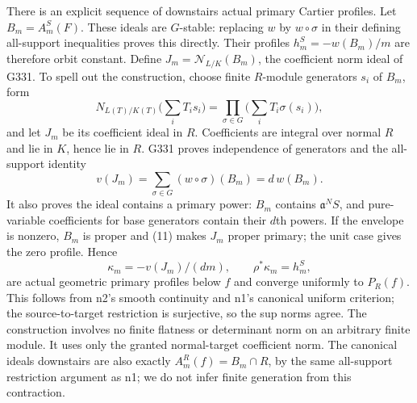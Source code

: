 There is an explicit sequence of downstairs actual primary Cartier profiles. Let $B_m=A_m^S(F)$. These ideals are $G$-stable: replacing $w$ by $w\circ\sigma$ in their defining all-support inequalities proves this directly. Their profiles $h_m^S=-w(B_m)/m$ are therefore orbit constant. Define $J_m=\mathcal N_{L/K}(B_m)$, the coefficient norm ideal of G331. To spell out the construction, choose finite $R$-module generators $s_i$ of $B_m$, form
\[
 N_{L(T)/K(T)}\Big(\sum_i T_i s_i\Big)
 =\prod_{\sigma\in G}\Big(\sum_i T_i\sigma(s_i)\Big),
\]
and let $J_m$ be its coefficient ideal in $R$. Coefficients are integral over normal $R$ and lie in $K$, hence lie in $R$. G331 proves independence of generators and the all-support identity
\[
 v(J_m)=\sum_{\sigma\in G}(w\circ\sigma)(B_m)=d\,w(B_m). \tag{11}
\]
It also proves the ideal contains a primary power: $B_m$ contains $\mathfrak a^NS$, and pure-variable coefficients for base generators contain their $d$th powers. If the envelope is nonzero, $B_m$ is proper and (11) makes $J_m$ proper primary; the unit case gives the zero profile. Hence
\[
 \kappa_m=-v(J_m)/(dm),\qquad \rho^*\kappa_m=h_m^S,
\]
are actual geometric primary profiles below $f$ and converge uniformly to $P_R(f)$. This follows from n2's smooth continuity and n1's canonical uniform criterion; the source-to-target restriction is surjective, so the sup norms agree. The construction involves no finite flatness or determinant norm on an arbitrary finite module. It uses only the granted normal-target coefficient norm. The canonical ideals downstairs are also exactly $A_m^R(f)=B_m\cap R$, by the same all-support restriction argument as n1; we do not infer finite generation from this contraction.

